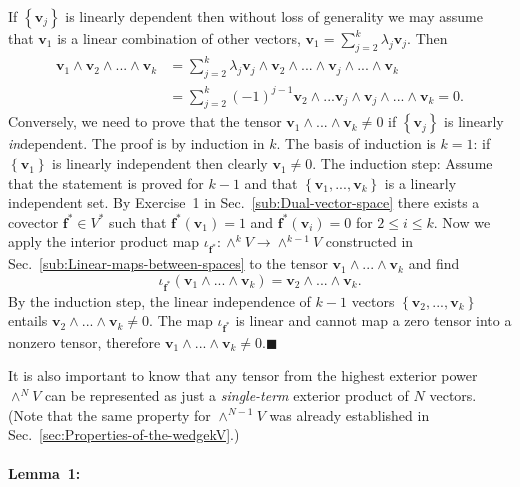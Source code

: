 If $\left\{ \mathbf{v}_{j}\right\} $ is linearly dependent then without
loss of generality we may assume that $\mathbf{v}_{1}$ is a linear
combination of other vectors, $\mathbf{v}_{1}=\sum_{j=2}^{k}\lambda_{j}\mathbf{v}_{j}$.
Then \begin{align*}
\mathbf{v}_{1}\wedge\mathbf{v}_{2}\wedge...\wedge\mathbf{v}_{k} & =\sum_{j=2}^{k}\lambda_{j}\mathbf{v}_{j}\wedge\mathbf{v}_{2}\wedge...\wedge\mathbf{v}_{j}\wedge...\wedge\mathbf{v}_{k}\\
 & =\sum_{j=2}^{k}\left(-1\right)^{j-1}\mathbf{v}_{2}\wedge...\mathbf{v}_{j}\wedge\mathbf{v}_{j}\wedge...\wedge\mathbf{v}_{k}=0.\end{align*}
Conversely, we need to prove that the tensor $\mathbf{v}_{1}\wedge...\wedge\mathbf{v}_{k}\neq0$
if $\left\{ \mathbf{v}_{j}\right\} $ is linearly \emph{in}dependent.
The proof is by induction in $k$. The basis of induction is $k=1$:
if $\left\{ \mathbf{v}_{1}\right\} $ is linearly independent then
clearly $\mathbf{v}_{1}\neq0$. The induction step: Assume that the
statement is proved for $k-1$ and that $\left\{ \mathbf{v}_{1},...,\mathbf{v}_{k}\right\} $
is a linearly independent set. By Exercise~1 in Sec.~\ref{sub:Dual-vector-space}
there exists a covector $\mathbf{f}^{*}\in V^{*}$ such that $\mathbf{f}^{*}\left(\mathbf{v}_{1}\right)=1$
and $\mathbf{f}^{*}\left(\mathbf{v}_{i}\right)=0$ for $2\leq i\leq k$.
Now we apply the interior product map $\iota_{\mathbf{f}^{*}}:\wedge^{k}V\rightarrow\wedge^{k-1}V$
constructed in Sec.~\ref{sub:Linear-maps-between-spaces} to the
tensor $\mathbf{v}_{1}\wedge...\wedge\mathbf{v}_{k}$ and find \[
\iota_{\mathbf{f}^{*}}\left(\mathbf{v}_{1}\wedge...\wedge\mathbf{v}_{k}\right)=\mathbf{v}_{2}\wedge...\wedge\mathbf{v}_{k}.\]
By the induction step, the linear independence of $k-1$ vectors $\left\{ \mathbf{v}_{2},...,\mathbf{v}_{k}\right\} $
entails $\mathbf{v}_{2}\wedge...\wedge\mathbf{v}_{k}\neq0$. The map
$\iota_{\mathbf{f}^{*}}$ is linear and cannot map a zero tensor into
a nonzero tensor, therefore $\mathbf{v}_{1}\wedge...\wedge\mathbf{v}_{k}\neq0$.\hfill{}$\blacksquare$

It is also important to know that any tensor from the highest exterior
power $\wedge^{N}V$ can be represented as just a \emph{single-term}
exterior product of $N$ vectors. (Note that the same property for
$\wedge^{N-1}V$ was already established in Sec.~\ref{sec:Properties-of-the-wedgekV}.)


\paragraph{Lemma~1:}

